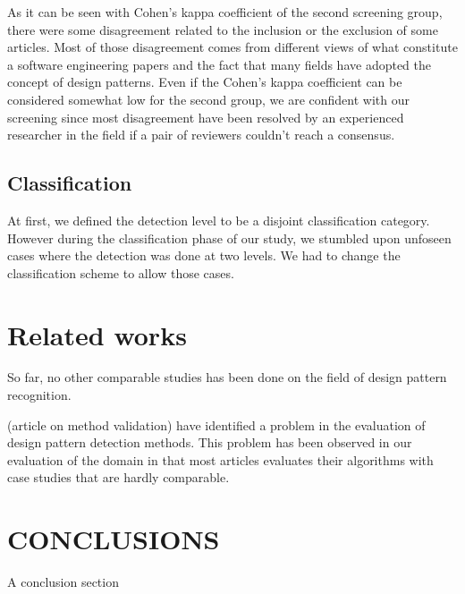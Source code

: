 \documentclass[letterpaper, 10 pt, conference]{ieeeconf}  %
\begin{document}
As it can be seen with Cohen's kappa coefficient of the second screening group,
there were some disagreement related to the inclusion or the exclusion of some
articles.
Most of those disagreement comes from different views of what constitute a
software engineering papers and the fact that many fields have adopted the
concept of design patterns.
Even if the Cohen's kappa coefficient can be considered somewhat low for the
second group, we are confident with our screening since most disagreement have
been resolved by an experienced researcher in the field if a pair of reviewers
couldn't reach a consensus.


\subsection{Classification}

At first, we defined the detection level to be a disjoint classification category.
However during the classification phase of our study, we stumbled upon unfoseen cases
where the detection was done at two levels. We had to change the classification
scheme to allow those cases.


\section{Related works}



So far, no other comparable studies has been done on the field of design pattern
recognition.

(article on method validation) have identified a problem in the evaluation of design
pattern detection methods. This problem has been observed in our evaluation of the
domain in that most articles evaluates their algorithms with case studies that are
hardly comparable.




\section{CONCLUSIONS}

A conclusion section 



\addtolength{\textheight}{-12cm}   

\end{document}

